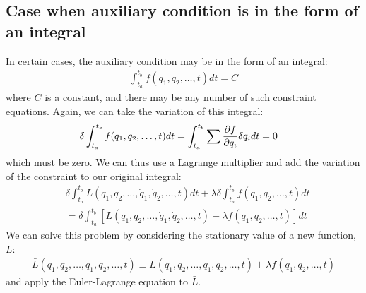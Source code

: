 \subsection{Case when auxiliary condition is in the form of an integral}
In certain cases, the auxiliary condition may be in the form of an integral:
\begin{align}
\int_{t_a}^{t_b} f(q_1,q_2,\dots,t)dt=C
\end{align}
where $C$ is a constant, and there may be any number of such constraint equations. Again, we can take the variation of this integral:
\begin{align}
\delta\int_{t_a}^{t_b} f(q_1,q_2,\dots,t)dt&=\int_{t_a}^{t_b} \sum \frac{\partial f}{\partial q_i}\delta q_i dt=0
\end{align}
which must be zero. We can thus use a Lagrange multiplier and add the variation of the constraint to our original integral:
\begin{align}
&\delta\int_{t_a}^{t_b}  L(q_1,q_2,\dots,\dot{q}_1, \dot{q}_2,\dots,t)dt+\lambda\delta\int_{t_a}^{t_b} f(q_1,q_2,\dots,t)dt\nonumber\\&=\delta \int_{t_a}^{t_b}\left[L(q_1,q_2,\dots,\dot{q}_1, \dot{q}_2,\dots,t)+\lambda f(q_1,q_2,\dots,t)\right] dt
\end{align}
We can solve this problem by considering the stationary value of a new function, $\bar L$:
\begin{align}
\bar L(q_1,q_2,\dots,\dot{q}_1, \dot{q}_2,\dots,t)\equiv L(q_1,q_2,\dots,\dot{q}_1, \dot{q}_2,\dots,t)+\lambda f(q_1,q_2,\dots,t)
\end{align}
and apply the Euler-Lagrange equation to $\bar L$.

